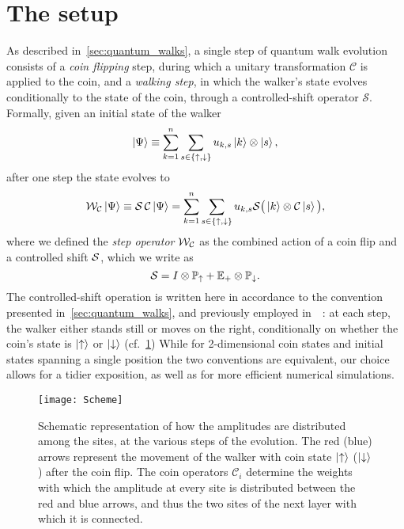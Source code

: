 \section{The setup}
\label{sec:qw_setup}
As described in~\cref{sec:quantum_walks}, a single step of quantum walk evolution consists of a \emph{coin flipping} step, during which a unitary { transformation} $\mathcal C$ is applied to the coin, and a \emph{walking step}, in which the walker's state evolves conditionally to the state of the coin, through a controlled-shift operator $\mathcal S$.
Formally, given an initial state of the walker
\begin{equation}
	\ket\Psi \equiv \sum_{k=1}^n \sum_{s\in\{\uparrow,\downarrow\}}
	u_{k,s} \ket{k} \otimes \ket{s},
	\label{eq:initial_state}
\end{equation}
after one step the state evolves to
\begin{equation}
	\mathcal W_{\mathcal C} \ket\Psi \equiv
	\mathcal S \,\mathcal C \ket\Psi
	= \sum_{k=1}^n \sum_{s\in\{\uparrow,\downarrow\}}
	u_{k,s}
	\mathcal S \big( \ket{k} \otimes \mathcal C \ket{s} \big),
	\label{eq:step_operator_definition}
\end{equation}
where we defined the \emph{step operator} ${\mathcal{W}}_{{\mathcal{C}}}$ as the combined action of a coin flip and a controlled shift ${\mathcal{S}}$, which we write as
\begin{equation}
	{\mathcal{S}} =
    I\otimes \mathbb{P}_\uparrow + \mathbb{E}_+\otimes\mathbb{P}_\downarrow.
	\label{eq:controlled_shift_operator}
\end{equation}
The controlled-shift operation is written here in accordance to the convention presented in~\cref{sec:quantum_walks}, and previously employed in~~\cite{hoyer2009faster, montero2013unidirectional,montero2015quantum}: at each step, the walker either stands still or moves on the right, conditionally on whether the coin's state is $\ket{\uparrow}$ or $\ket{\downarrow}$ (cf.~\cref{fig:qw_conceptual_scheme_walker})
While for 2-dimensional coin states and initial states spanning a single position the two conventions are equivalent, our choice allows for a tidier exposition, as well as for more efficient numerical simulations.

\begin{figure}[tb]
\center
\texttt{[image: Scheme]}
\caption{
    Schematic representation of how the amplitudes are distributed among the sites, at the various steps of the evolution.
    The red (blue) arrows represent the movement of the walker with coin state $\ket\uparrow$ ($\ket\downarrow$) after the coin flip.
    The coin operators $\mathcal C_i$ determine the weights with which the amplitude at every site is distributed between the red and blue arrows, and thus the two sites of the next layer with which it is connected.
}
\label{fig:qw_conceptual_scheme_walker}
\end{figure}

